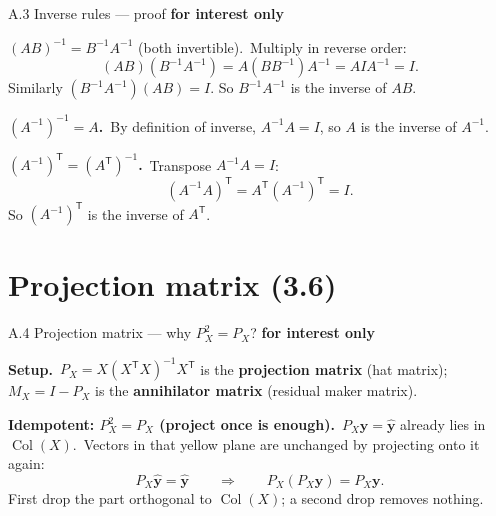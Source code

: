 \documentclass[11pt,aspectratio=169]{beamer}
\newcommand{\InterestOnly}{\textcolor{mAccent}{\textbf{for interest only}}}
\begin{document}
\begin{frame}{A.3 Inverse rules --- proof}
  \footnotesize
  \InterestOnly

  \medskip
  \textbf{$(AB)^{-1}=B^{-1}A^{-1}$} (both invertible).\
  Multiply in reverse order:
  \[
    (AB)(B^{-1}A^{-1})=A(BB^{-1})A^{-1}=AIA^{-1}=I.
  \]
  Similarly $(B^{-1}A^{-1})(AB)=I$. So $B^{-1}A^{-1}$ is the inverse of $AB$.

  \medskip
  \textbf{$(A^{-1})^{-1}=A$.}\
  By definition of inverse, $A^{-1}A=I$, so $A$ is the inverse of $A^{-1}$.

  \medskip
  \textbf{$(A^{-1})^{\mathsf T}=(A^{\mathsf T})^{-1}$.}\
  Transpose $A^{-1}A=I$:
  \[
    (A^{-1}A)^{\mathsf T}=A^{\mathsf T}(A^{-1})^{\mathsf T}=I.
  \]
  So $(A^{-1})^{\mathsf T}$ is the inverse of $A^{\mathsf T}$.
\end{frame}

\section{Projection matrix (3.6)}

\begin{frame}{A.4 Projection matrix --- why $P_X^2=P_X$?}
  \hypertarget{sec:projection-matrix-properties}{}
  \footnotesize
  \InterestOnly

  \medskip
  \textbf{Setup.}\
  $P_X=X(X^{\mathsf T}X)^{-1}X^{\mathsf T}$ is the \textbf{projection matrix} (hat matrix);\
  $M_X=I-P_X$ is the \textbf{annihilator matrix} (residual maker matrix).

  \medskip
  \textbf{Idempotent: $P_X^2=P_X$ (project once is enough).}\
  $P_X\mathbf{y}=\widehat{\mathbf{y}}$ already lies in $\operatorname{Col}(X)$.\
  Vectors in that yellow plane are unchanged by projecting onto it again:
  \[
    P_X\widehat{\mathbf{y}}=\widehat{\mathbf{y}}
    \qquad\Longrightarrow\qquad
    P_X(P_X\mathbf{y})=P_X\mathbf{y}.
  \]
  First drop the part orthogonal to $\operatorname{Col}(X)$; a second drop removes nothing.
\end{frame}
\end{document}
